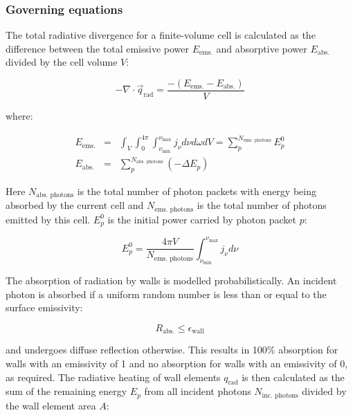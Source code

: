 \subsubsection{Governing equations}

The total radiative divergence for a finite-volume cell is calculated as the difference between the total emissive power $E_{\text{ems.}}$ and absorptive power $E_{\text{abs.}}$ divided by the cell volume $V$:

\begin{equation}
 - \nabla \cdot \vec{q}_\text{rad} = \frac{ - \left ( E_{\text{ems.}} - E_{\text{abs.}} \right ) }{V}
 \label{eq:my_divq}
\end{equation}

\noindent where:

\begin{eqnarray}
 E_{\text{ems.}} &=& \int_{V} \int_{0}^{{4\pi}} \int_{\nu_{\text{min}}}^{\nu_{\text{max}}} j_{\nu} d\nu d\omega dV = \sum_{p}^{N_{\text{ems. photons}}} E_{p}^0 \label{eq:E_emission} \\
 E_{\text{abs.}} &=& \sum_{p}^{N_{\text{abs. photons}}} \left ( - \Delta E_{p} \right ) \label{eq:E_absorption} 
\end{eqnarray}

\noindent Here $N_{\text{abs. photons}}$ is the total number of photon packets with energy being absorbed by the current cell and $N_{\text{ems. photons}}$ is the total number of photons emitted by this cell.
$E_{p}^0$ is the initial power carried by photon packet $p$:

\begin{equation}
 E_{p}^0 = \frac{ 4 \pi V  }{ N_{\text{ems. photons} } } \int_{\nu_{\text{min}}}^{\nu_{\text{max}}} j_{\nu} d \nu
\end{equation}

The absorption of radiation by walls is modelled probabilistically.  An incident photon is absorbed if a uniform random number is less than or equal to the surface emissivity:

\begin{equation}
R_\text{abs.} \leq \epsilon_\text{wall}
\end{equation}

\noindent and undergoes diffuse reflection otherwise.
This results in 100\% absorption for walls with an emissivity of 1 and no absorption for walls with an emissivity of 0, as required.
The radiative heating of wall elements $q_\text{rad}$ is then calculated as the sum of the remaining energy $E_{p}$ from all incident photons $N_\text{inc. photons}$ divided by the wall element area $A$:

